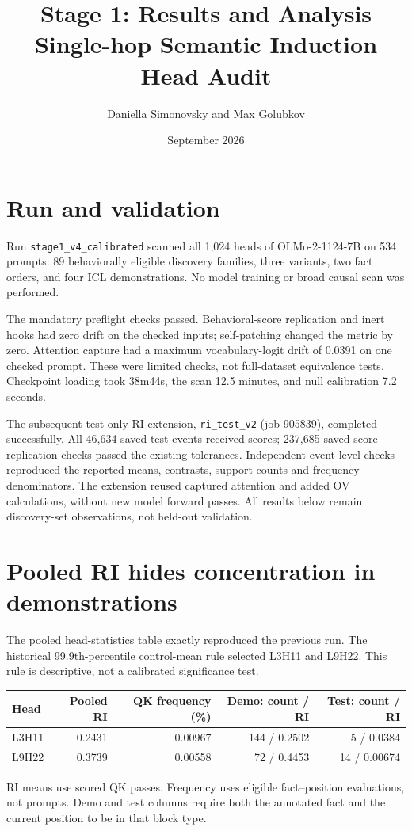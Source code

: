 \documentclass[11pt,a4paper]{article}
\title{Stage 1: Results and Analysis\\\large Single-hop Semantic Induction Head Audit}
\author{Daniella Simonovsky and Max Golubkov}
\date{September 2026}
\begin{document}
\maketitle

\section{Run and validation}
Run \texttt{stage1\_v4\_calibrated} scanned all 1,024 heads of OLMo-2-1124-7B on 534 prompts: 89 behaviorally eligible discovery families, three variants, two fact orders, and four ICL demonstrations. No model training or broad causal scan was performed.

The mandatory preflight checks passed. Behavioral-score replication and inert hooks had zero drift on the checked inputs; self-patching changed the metric by zero. Attention capture had a maximum vocabulary-logit drift of 0.0391 on one checked prompt. These were limited checks, not full-dataset equivalence tests. Checkpoint loading took 38m44s, the scan 12.5 minutes, and null calibration 7.2 seconds.

The subsequent test-only RI extension, \texttt{ri\_test\_v2} (job 905839), completed successfully. All 46,634 saved test events received scores; 237,685 saved-score replication checks passed the existing tolerances. Independent event-level checks reproduced the reported means, contrasts, support counts and frequency denominators. The extension reused captured attention and added OV calculations, without new model forward passes. All results below remain discovery-set observations, not held-out validation.

\section{Pooled RI hides concentration in demonstrations}
The pooled head-statistics table exactly reproduced the previous run. The historical 99.9th-percentile control-mean rule selected L3H11 and L9H22. This rule is descriptive, not a calibrated significance test.

\begin{center}
\small
\begin{tabular}{lrrrr}
\toprule
Head & Pooled RI & QK frequency (\%) & Demo: count / RI & Test: count / RI \\
\midrule
L3H11 & 0.2431 & 0.00967 & 144 / 0.2502 & 5 / 0.0384 \\
L9H22 & 0.3739 & 0.00558 & 72 / 0.4453 & 14 / 0.00674 \\
\bottomrule
\end{tabular}
\end{center}
RI means use scored QK passes. Frequency uses eligible fact--position evaluations, not prompts. Demo and test columns require both the annotated fact and the current position to be in that block type.
\end{document}
